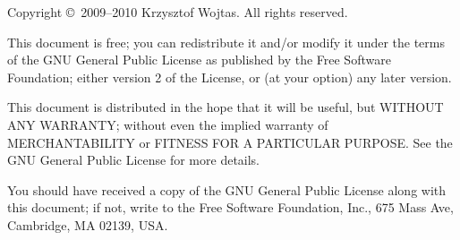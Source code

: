 \begingroup

	\newlength{\centeroffset}
	\setlength{\centeroffset}{-0.5\oddsidemargin}
	\addtolength{\centeroffset}{0.5\evensidemargin}

	\begingroup
		\sffamily
		\thispagestyle{empty}

		\noindent\hspace*{\centeroffset}


		\noindent\hspace*{\centeroffset}

		\pagebreak
	\endgroup

	\begingroup
		\setlength{\parindent}{0pt}
		\setlength{\parskip}{1ex}

		\begingroup
			\TPSwitchToEnglish
			\begin{small}
				Copyright \copyright\ 2009--2010 Krzysztof Wojtas. All rights reserved.
				
				This document is free; you can redistribute it and/or modify it under the terms of the GNU General Public License as published by the Free Software Foundation; either version 2 of the License, or (at your option) any later version.

				This document is distributed in the hope that it will be useful, but WITHOUT ANY WARRANTY; without even the implied warranty of MERCHANTABILITY or FITNESS FOR A PARTICULAR PURPOSE\@. See the GNU General Public License for more details.

				You should have received a copy of the GNU General Public License along with this document; if not, write to the Free Software Foundation, Inc., 675 Mass Ave, Cambridge, MA 02139, USA\@.
			\end{small}
		\endgroup
		
